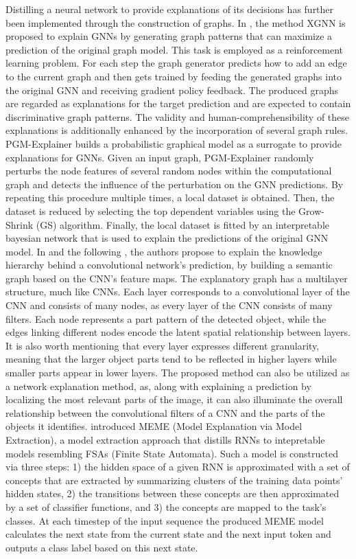 \documentclass[journal]{IEEEtran}
\begin{document}
Distilling a neural network to provide explanations of its decisions has further been implemented through the construction of graphs. 
In \cite{Yuan2020a}, the method XGNN is proposed to explain GNNs by  generating graph patterns that can maximize a prediction of the original graph model. This task is employed as a reinforcement learning problem. For each step the graph generator predicts how to add an edge to the current graph and then gets trained by feeding the generated graphs into the original GNN and receiving gradient policy feedback. The produced graphs are regarded as explanations for the target prediction and are expected to contain discriminative graph patterns. The validity and human-comprehensibility of these explanations is additionally enhanced by the incorporation of several graph rules. 
PGM-Explainer \cite{Vu2020} builds a probabilistic graphical model as a surrogate to provide explanations for GNNs. Given an input graph, PGM-Explainer randomly perturbs the node features of several random nodes within the computational graph and detects the influence of the perturbation on the GNN predictions. By repeating this procedure multiple times, a local dataset is obtained. Then, the dataset is reduced by selecting the top dependent variables using the Grow-Shrink (GS) algorithm. Finally, the local dataset is fitted by an interpretable bayesian network that is used to explain the predictions of the original GNN model. 
In \cite{Zhang2017} and the following \cite{Zhang2017a}, the authors propose to explain the knowledge hierarchy behind a convolutional network’s prediction, by building a semantic graph based on the CNN’s feature maps. The explanatory graph has a multilayer structure, much like CNNs. Each layer corresponds to a convolutional layer of the CNN and consists of many nodes, as every layer of the CNN consists of many filters. Each node represents a part pattern of the detected object, while the edges linking different nodes encode the latent spatial relationship between layers. It is also worth mentioning that every layer expresses different granularity, meaning that the larger object parts tend to be reflected in higher layers while smaller parts appear in lower layers. The proposed method can also be utilized as a network explanation method, as, along with explaining a prediction by localizing the most relevant parts of the image, it can also illuminate the overall relationship between the convolutional filters of a CNN and the parts of the objects it identifies.
\cite{Kazhdan2020} introduced MEME (Model Explanation via Model Extraction), a model extraction approach that distills RNNs to intepretable models resembling FSAs (Finite State Automata). Such a model is constructed via three steps: 1) the hidden space of a given RNN is approximated with a set of concepts that are extracted by summarizing clusters of the training data points' hidden states, 2) the transitions between these concepts are then approximated by a set of classifier functions, and 3) the concepts are mapped to the task's classes. At each timestep of the input sequence the produced MEME model calculates the next state from the current state and the next input token and outputs a class label based on this next state.
\end{document}

